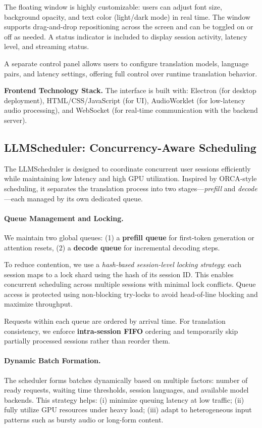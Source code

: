 The floating window is highly customizable: users can adjust font size, background opacity, and text color (light/dark mode) in real time. The window supports drag-and-drop repositioning across the screen and can be toggled on or off as needed. A status indicator is included to display session activity, latency level, and streaming status.

A separate control panel allows users to configure translation models, language pairs, and latency settings, offering full control over runtime translation behavior.

\noindent\textbf{Frontend Technology Stack.}
The interface is built with:
Electron (for desktop deployment), HTML/CSS/JavaScript (for UI),
AudioWorklet (for low-latency audio processing),
and WebSocket (for real-time communication with the backend server).

\subsection{LLMScheduler: Concurrency-Aware Scheduling}

The LLMScheduler is designed to coordinate concurrent user sessions efficiently while maintaining low latency and high GPU utilization. Inspired by ORCA-style scheduling, it separates the translation process into two stages---\textit{prefill} and \textit{decode}---each managed by its own dedicated queue.

\paragraph{Queue Management and Locking.}
We maintain two global queues:
(1) a \textbf{prefill queue} for first-token generation or attention resets,
(2) a \textbf{decode queue} for incremental decoding steps.

To reduce contention, we use a \textit{hash-based session-level locking strategy}: each session maps to a lock shard using the hash of its session ID. This enables concurrent scheduling across multiple sessions with minimal lock conflicts. Queue access is protected using non-blocking try-locks to avoid head-of-line blocking and maximize throughput.

Requests within each queue are ordered by arrival time. For translation consistency, we enforce \textbf{intra-session FIFO} ordering and temporarily skip partially processed sessions rather than reorder them.

\paragraph{Dynamic Batch Formation.}
The scheduler forms batches dynamically based on multiple factors:
number of ready requests, waiting time thresholds, session languages, and available model backends. 
This strategy helps:
(i) minimize queuing latency at low traffic;
(ii) fully utilize GPU resources under heavy load;
(iii) adapt to heterogeneous input patterns such as bursty audio or long-form content.

